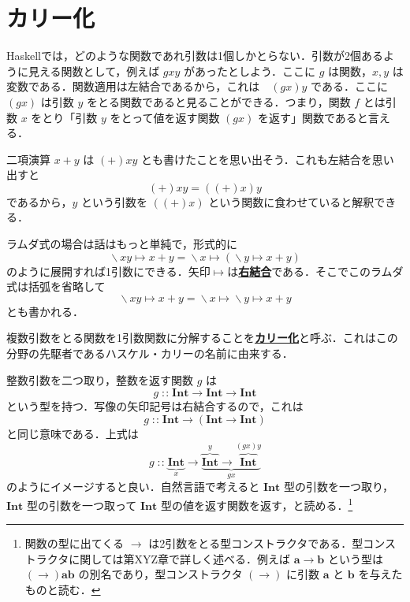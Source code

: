 \documentclass[a5paper,twoside,fleqn,draft]{jsbook}
\newcommand{\programminglanguage}[1]{\textsf{#1}}
\newcommand{\haskell}{\programminglanguage{Haskell}}
\newcommand{\keyword}[1]{{\underline{\textbf{#1}}}}
\DeclareMathOperator{\mFuncArrow}{\rightarrow}
\DeclareMathOperator{\mIn}{{:\!:}}
\DeclareMathOperator{\mLambda}{\backslash}
\DeclareMathOperator{\mLambdaArrow}{\mapsto}
\newcommand{\mType}[1]{\mathbf{#1}} %
\newcommand{\mA}{\mType{a}}
\newcommand{\mB}{\mType{b}}
\newcommand{\mIntType}{\mType{Int}}
\begin{document}
\section{カリー化}

\haskell では，どのような関数であれ引数は1個しかとらない．引数が2個あるように見える関数として，例えば $gxy$ があったとしよう．ここに $g$ は関数，$x,y$ は変数である．関数適用は左結合であるから，これは　$\left(gx\right)y$ である．ここに $\left(gx\right)$ は引数 $y$ をとる関数であると見ることができる．つまり，関数 $f$ とは引数 $x$ をとり「引数 $y$ をとって値を返す関数 $\left(gx\right)$ を返す」関数であると言える．

二項演算 $x+y$ は $(+)xy$ とも書けたことを思い出そう．これも左結合を思い出すと
\begin{equation}
  (+)xy
  =\left((+)x\right)y
\end{equation}
であるから，$y$ という引数を $\left((+)x\right)$ という関数に食わせていると解釈できる．

ラムダ式の場合は話はもっと単純で，形式的に
\begin{equation}
  \mLambda xy\mLambdaArrow x+y
  =\mLambda x\mLambdaArrow\left(\mLambda y\mLambdaArrow x+y\right)
\end{equation}
のように展開すれば1引数にできる．矢印$\mLambdaArrow$は\keyword{右結合}である．そこでこのラムダ式は括弧を省略して
\begin{equation}
  \mLambda xy\mLambdaArrow x+y
  =\mLambda x\mLambdaArrow\mLambda y\mLambdaArrow x+y
\end{equation}
とも書かれる．

複数引数をとる関数を1引数関数に分解することを\keyword{カリー化}と呼ぶ．これはこの分野の先駆者であるハスケル・カリーの名前に由来する．


整数引数を二つ取り，整数を返す関数 $g$ は
\begin{equation}
  g
  \mIn\mIntType\mFuncArrow\mIntType\mFuncArrow\mIntType
\end{equation}
という型を持つ．写像の矢印記号は右結合するので，これは
\begin{equation}
  g
  \mIn\mIntType\mFuncArrow(\mIntType\mFuncArrow\mIntType)
\end{equation}
と同じ意味である．上式は
\begin{equation*}
  g
  \mIn\underbrace{\mIntType}_x
  \mFuncArrow\underbrace{\overbrace{\mIntType}^y\mFuncArrow\overbrace{\mIntType}^{(gx)y}}_{gx}
\end{equation*}
のようにイメージすると良い．自然言語で考えると $\mIntType$ 型の引数を一つ取り，$\mIntType$ 型の引数を一つ取って $\mIntType$ 型の値を返す関数を返す，と読める．\footnote{関数の型に出てくる $\mFuncArrow$ は2引数をとる型コンストラクタである．型コンストラクタに関しては第XYZ章で詳しく述べる．例えば $\mA\mFuncArrow\mB$ という型は $(\mFuncArrow)\mA\mB$ の別名であり，型コンストラクタ $(\mFuncArrow)$ に引数 $\mA$ と $\mB$ を与えたものと読む．}
\end{document}
